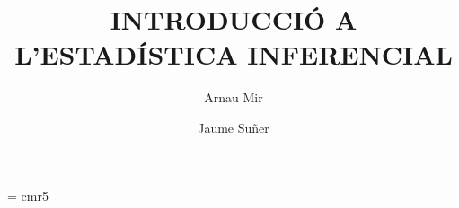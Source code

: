 \documentclass[11pt,a4paper]{book}
\makeatletter
\newcounter{problema}
\renewcommand\tableofcontents{%
    \if@twocolumn
      \@restonecoltrue\onecolumn
    \else
      \@restonecolfalse
    \fi
    \chapter*{\contentsname
        \@mkboth{%
           \contentsname}{\contentsname}}%
    \@starttoc{toc}%
    \if@restonecol\twocolumn\fi
    }
\renewcommand\listoffigures{%
    \if@twocolumn
      \@restonecoltrue\onecolumn
    \else
      \@restonecolfalse
    \fi
    \chapter*{\listfigurename
      \@mkboth{\listfigurename}%
              {\listfigurename}}%
    \@starttoc{lof}%
    \if@restonecol\twocolumn\fi
    }
\makeatother
\begin{document}
\font\fiverm = cmr5



\newcommand{\bblref}[1]{{\bf \ref{#1}}}
\newtheorem{proposition}{Proposici\'o}[chapter]
\newtheorem{defin}{Definici\'o}[chapter]
\setcounter{problema}{0}
\setcounter{cas}{0}
\newcommand{\e}{{\rm e}}
\newcommand{\EE}{{\rm E}}
\newcommand{\Var}{{\rm Var}}
\newcommand{\Cov}{{\rm Cov}}
\newcommand{\pp}[1]{p\left\{#1\right\}}
\renewcommand{\thecas}{\Roman{cas}}
\newcommand{\posacas}{\addtocounter{cas}{1}{\bf \thecas}}
\makeatletter
{}
\makeatother
\makeatletter
\def\etiqueta#1{\immediate\write\@auxout{\string
      \newlabel{#1}{{\thechapter .\theproblema}}}}
\makeatother
\newcommand{\text}[1]{\mbox{#1}}

\newenvironment{prob}
{\addtocounter{problema}{1}
\noindent
{\textbf{\thechapter.\theproblema.- }}}
{
\vspace{\baselineskip}}

\newlength\amplada
\setlength{\amplada}{\textwidth - 8mm}
\newenvironment{probres}[1]
{\addtocounter{problema}{1}
\noindent\shadowbox{
\parbox{\amplada}{
\noindent
{\textbf{\thechapter.\theproblema.- }}#1}}}
{
\vspace{\baselineskip}}

\newcommand{\prb}[1]{\addtocounter{problema}{1}
\noindent
{\textbf{\thechapter.\theproblema.- }#1}
\vspace{\baselineskip}
}
\newcommand{\prbr}[1]{\addtocounter{problema}{1}
\noindent\shadowbox{
\parbox{\textwidth}{
\noindent
{\textbf{\thechapter.\theproblema.- }#1}
}}
\vspace{\baselineskip}
}

\newcommand{\res}[1]{
\textbf{Resoluci\'o. }{\sf #1}
\vspace{\baselineskip}
}
\title{INTRODUCCI\'O A L'ESTAD\'ISTICA INFERENCIAL
}
\author{Arnau Mir\and
Jaume Su\~ner}
%















\nocite{*}


\printindex
\end{document}
